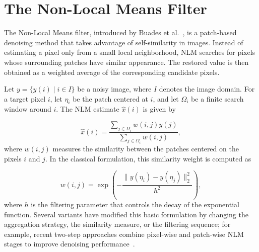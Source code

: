 \documentclass[pdflatex,iicol,sn-mathphys-num]{sn-jnl}
\newcommand{\nlm}{NLM\xspace}
\newif\ifshowportuguese
\newcommand{\pt}[1]{\ifshowportuguese\par\begingroup\small\color{blue!55!black}\noindent\textbf{PT: }#1\par\endgroup\fi}
\begin{document}
\section{The Non-Local Means Filter}
\label{sec:nlm}


The Non-Local Means filter, introduced by Buades et al.~\cite{buades2005nlm}, is a patch-based denoising method that takes advantage of self-similarity in images. Instead of estimating a pixel only from a small local neighborhood, \nlm searches for pixels whose surrounding patches have similar appearance. The restored value is then obtained as a weighted average of the corresponding candidate pixels.
\pt{O filtro Non-Local Means, introduzido por Buades et al.~\cite{buades2005nlm}, é um método de denoising baseado em patches que explora a auto-similaridade em imagens. Em vez de estimar um pixel apenas a partir de uma pequena vizinhança local, o \nlm busca pixels cujos patches ao redor apresentam aparência semelhante. O valor restaurado é então obtido como uma média ponderada dos pixels candidatos correspondentes.}

Let \(y=\{y(i)\mid i\in I\}\) be a noisy image, where \(I\) denotes the image domain. For a target pixel \(i\), let \(\eta_i\) be the patch centered at \(i\), and let \(\Omega_i\) be a finite search window around \(i\). The \nlm estimate \(\hat{x}(i)\) is given by
\pt{Seja \(y=\{y(i)\mid i\in I\}\) uma imagem ruidosa, em que \(I\) denota o domínio da imagem. Para um pixel alvo \(i\), seja \(\eta_i\) o patch centrado em \(i\), e seja \(\Omega_i\) uma janela de busca finita ao redor de \(i\). A estimativa NLM \(\hat{x}(i)\) é dada por}
\begin{equation}
    \hat{x}(i)
    =
    \frac{
    \sum_{j\in\Omega_i} w(i,j)y(j)
    }{
    \sum_{j\in\Omega_i} w(i,j)
    },
    \label{eq:nlm_estimate}
\end{equation}
where \(w(i,j)\) measures the similarity between the patches centered on the pixels \(i\) and \(j\). In the classical formulation, this similarity weight is computed as
\pt{em que \(w(i,j)\) mede a similaridade entre os patches centrados nos pixels \(i\) e \(j\). Na formulação clássica, esse peso de similaridade é calculado como}
\begin{equation}
    w(i,j)
    =
    \exp
    \left(
    -
    \frac{
    \|y(\eta_i)-y(\eta_j)\|_2^2
    }{
    h^2
    }
    \right),
    \label{eq:nlm_weight}
\end{equation}
where \(h\) is the filtering parameter that controls the decay of the exponential function. Several variants have modified this basic formulation by changing the aggregation strategy, the similarity measure, or the filtering sequence; for example, recent two-step approaches combine pixel-wise and patch-wise \nlm stages to improve denoising performance~\cite{zhang2025two}.
\pt{em que \(h\) é o parâmetro de filtragem que controla o decaimento da função exponencial. Diversas variantes modificaram essa formulação básica alterando a estratégia de agregação, a medida de similaridade ou a sequência de filtragem; por exemplo, abordagens recentes em duas etapas combinam estágios NLM pixel-wise e patch-wise para melhorar o desempenho de denoising~\cite{zhang2025two}.}
\end{document}
